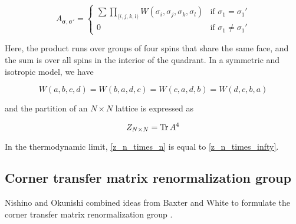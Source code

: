 \begin{equation}
  A_{\bm{\sigma}, \bm{\sigma'}} =
  \begin{cases}
    \sum \prod_{\langle i, j, k, l \rangle} W(\sigma_i, \sigma_j, \sigma_k, \sigma_l) & \text{if } \sigma_{1} = \sigma_{1}' \\
    0 & \text{if } \sigma_{1} \neq \sigma_{1}'
  \end{cases}
\end{equation}

Here, the product runs over groups of four spins that share the same face, and
the sum is over all spins in the interior of the quadrant.
In a symmetric and isotropic model, we have

\begin{equation}
  W(a, b, c, d) = W(b, a, d, c) = W(c, a, d, b) = W(d, c, b, a)
\end{equation}

and the partition of an $N \times N$ lattice is expressed as

\begin{equation}\label{z_n_times_n}
  Z_{N \times N} = \operatorname{Tr} A^4
\end{equation}

In the thermodynamic limit, \eqref{z_n_times_n} is equal to \eqref{z_n_times_infty}.



\subsection{Corner transfer matrix renormalization group}

Nishino and Okunishi combined ideas from Baxter and White to formulate the
corner transfer matrix renormalization group \cite{nishino1996corner}.

